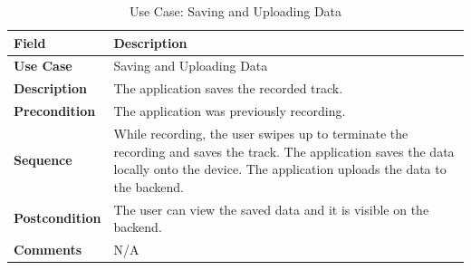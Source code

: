 \documentclass[12pt]{article}
\begin{document}
\begin{table}[h!]
\centering
\begin{tabular}{|p{3cm}|p{11cm}|}
\hline
\textbf{Field} & \textbf{Description} \\
\hline
\textbf{Use Case}   & Saving and Uploading Data \\
\hline
\textbf{Description} & The application saves the recorded track. \\
\hline
\textbf{Precondition} & The application was previously recording. \\
\hline
\textbf{Sequence} & While recording, the user swipes up to terminate the recording and saves the track. The application saves the data locally onto the device. The application uploads the data to the backend. \\
\hline
\textbf{Postcondition} & The user can view the saved data and it is visible on the backend. \\
\hline
\textbf{Comments} & N/A \\
\hline
\end{tabular}
\caption{Use Case: Saving and Uploading Data}
\end{table}
\end{document}
